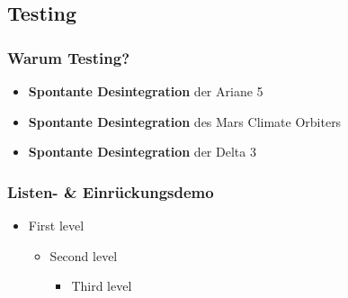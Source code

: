 \documentclass[t]{beamer}
\begin{document}
\subsection{Testing}

\begin{frame}
  \frametitle{Warum Testing?}
  \begin{itemize}
    \item \textbf{Spontante Desintegration} der Ariane 5
    \item \textbf{Spontante Desintegration} des Mars Climate Orbiters
    \item \textbf{Spontante Desintegration} der Delta 3
  \end{itemize}
\end{frame}

\begin{frame}
  \frametitle{Listen- \& Einrückungsdemo}
  \begin{itemize}
    \item First level
    \begin{itemize}
      \item Second level
      \begin{itemize}
        \item Third level
      \end{itemize}
    \end{itemize}
  \end{itemize}
\end{frame}

\end{document}
